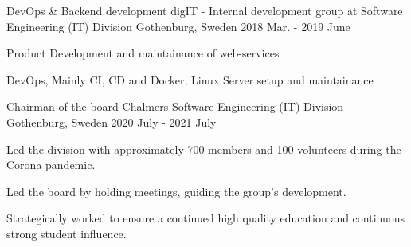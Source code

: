 \begin{cventries}
  \cventry
    {DevOps \& Backend development} %
    {digIT - Internal development group at Software Engineering (IT) Division} %
    {Gothenburg, Sweden} %
    {2018 Mar. - 2019 June} %
    {
      \begin{cvitems} %
        \item {Product Development and maintainance of web-services}
        \item {DevOps, Mainly CI, CD and Docker, Linux Server setup and maintainance}
      \end{cvitems}
    }
    \cventry
    {Chairman of the board} %
    {Chalmers Software Engineering (IT) Division} %
    {Gothenburg, Sweden} %
    {2020 July - 2021 July} %
    {\begin{cvitems}
        \item Led the division with approximately 700 members and 100 volunteers during the Corona pandemic.
        \item Led the board by holding meetings, guiding the group's development.  
        \item Strategically worked to ensure a continued high quality education and continuous strong student influence.
    \end{cvitems}{}
    }

\end{cventries}
